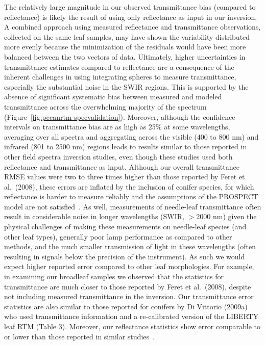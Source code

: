 The relatively large magnitude in our observed transmittance bias (compared to reflectance) is likely the result of using only reflectance as input in our inversion.
A combined approach using measured reflectance and transmittance observations, collected on the same leaf samples, may have shown the variability distributed more evenly because the minimization of the residuals would have been more balanced between the two vectors of data.
Ultimately, higher uncertainties in transmittance estimates compared to reflectance are a consequence of the inherent challenges in using integrating spheres to measure transmittance, especially the substantial noise in the SWIR regions.
This is supported by the absence of significant systematic bias between measured and modeled transmittance across the overwhelming majority of the spectrum (Figure~\ref{fig:pecanrtm-specvalidation}). %
Moreover, although the confidence intervals on transmittance bias are as high as 25\% at some wavelengths, averaging over all spectra and aggregating across the visible (400 to 800 nm) and infrared (801 to 2500 nm) regions leads to results similar to those reported in other field spectra inversion studies, even though these studies used both reflectance and transmittance as input.%
Although our overall transmittance RMSE values were two to three times higher than those reported by Feret et al.~(2008), \nocite{feret_2008_prospect}
these errors are inflated by the inclusion of conifer species, for which reflectance is harder to measure reliably and the assumptions of the PROSPECT model are not satisfied~\cite{jacquemoud_1990_prospect,divittorio_2009_enhancing,allen_1969_interaction}.
As well, measurements of needle-leaf transmittance often result in considerable noise in longer wavelengths (SWIR, $>$2000 nm) given
the physical challenges of making these measurements on needle-leaf species (and other leaf types),
generally poor lamp performance as compared to other methods,
and the much smaller transmission of light in these wavelengths (often resulting in signals below the precision of the instrument).
As such we would expect higher reported error compared to other leaf morphologies.
For example, in examining our broadleaf samples we observed that the statistics for transmittance are much closer to those reported by Feret et al.~(2008), despite not including measured transmittance in the inversion. %
Our transmittance error statistics are also similar to those reported for conifers by Di Vittorio (2009a) who used transmittance information and a re-calibrated version of the LIBERTY leaf RTM (Table 3). %
Moreover, our reflectance statistics show error comparable to or lower than those reported in similar studies~\cite{feret_2008_prospect,divittorio_2009_enhancing}.


